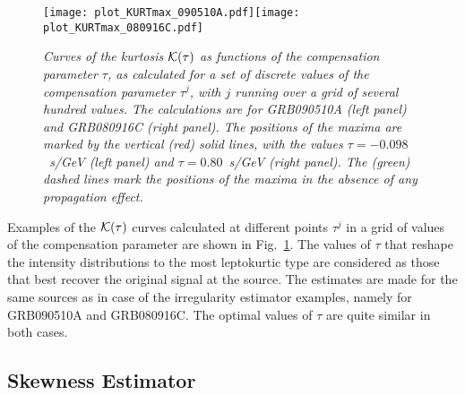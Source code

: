 \documentclass[12pt]{article}
\begin{document}
{%
\begin{figure}
\centering
\texttt{[image: plot\_KURTmax\_090510A.pdf]}\hspace{0cm}\texttt{[image: plot\_KURTmax\_080916C.pdf]}
\vspace{-0.4cm}
\caption{\it Curves of the kurtosis ${\cal K(\tau )}$ as functions of the compensation parameter $\tau $,
as calculated for a set of discrete values of the compensation parameter $\tau ^j$,
with $j$ running over a grid of several hundred values. The calculations are for
GRB090510A (left panel) and GRB080916C (right panel). The positions of the maxima are
marked by the vertical (red) solid lines, with the values $\tau  =- 0.098$~s/GeV (left panel)
and $\tau  = 0.80$~s/GeV (right panel).
The (green) dashed lines mark the positions of the maxima in the absence of any propagation effect.}
\label{fig:KURT}
\end{figure}

Examples of the ${\cal K(\tau )}$ curves calculated at different points $\tau ^j$ in a grid of values of the
compensation parameter are shown in Fig.~\ref{fig:KURT}. The values of $\tau $ that reshape the intensity
distributions to the most leptokurtic type are considered as those that best recover the original signal at the source.
The estimates are made for the same sources as in case of the irregularity estimator examples, namely for
GRB090510A and GRB080916C. The optimal values of $\tau $ are quite similar in both cases.

\subsection{Skewness Estimator}
\label{sec:skewness}

}
\end{document}
